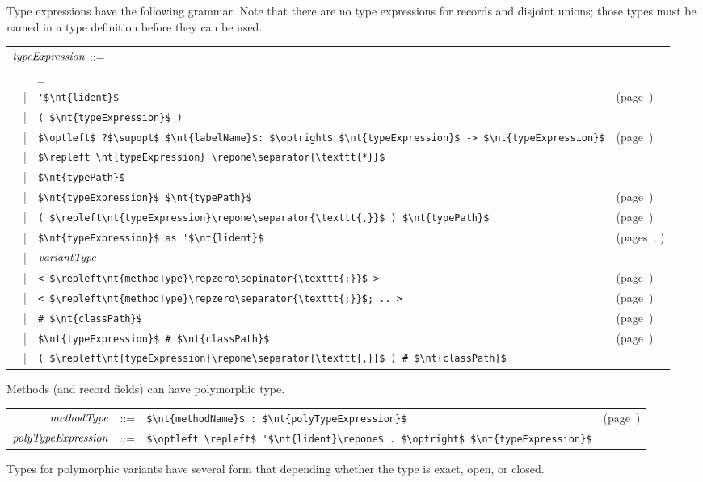 Type expressions have the following grammar.  Note that there are no type expressions for records
and disjoint unions; those types must be named in a type definition before they can be used.

\begin{center}
\begin{tabular}{rcll}
\multicolumn{3}{l}{$\textit{\rmfamily typeExpression}$ ::=}\\
&   & \hbox{\lstinline/_/}\\
& | & \hbox{\lstinline/'$\nt{lident}$/} & (page~\pageref{keyword:'})\\
& | & \hbox{\lstinline/( $\nt{typeExpression}$ )/}\\
& | & \hbox{\lstinline/$\optleft$ ?$\supopt$ $\nt{labelName}$: $\optright$ $\nt{typeExpression}$ -> $\nt{typeExpression}$/} & (page~\pageref{keyword:->})\\
& | & \hbox{\lstinline/$\repleft \nt{typeExpression} \repone\separator{\texttt{*}}$/}\\
& | & \hbox{\lstinline/$\nt{typePath}$/}\\
& | & \hbox{\lstinline/$\nt{typeExpression}$ $\nt{typePath}$/} & (page~\pageref{keyword:'})\\
& | & \hbox{\lstinline/( $\repleft\nt{typeExpression}\repone\separator{\texttt{,}}$ ) $\nt{typePath}$/} & (page~\pageref{keyword:'})\\
& | & \hbox{\lstinline/$\nt{typeExpression}$ as '$\nt{lident}$/} & (pages~\pageref{keyword:as(types)}, \pageref{keyword:as(object-types)})\\
& | & $\textit{\rmfamily variantType}$\\
& | & \hbox{\lstinline/< $\repleft\nt{methodType}\repzero\sepinator{\texttt{;}}$ >/} & (page~\pageref{object-types})\\
& | & \hbox{\lstinline/< $\repleft\nt{methodType}\repzero\separator{\texttt{;}}$; .. >/} & (page~\pageref{keyword:..})\\
& | & \hbox{\lstinline/# $\nt{classPath}$/} & (page~\pageref{keyword:hash-class})\\
& | & \hbox{\lstinline/$\nt{typeExpression}$ # $\nt{classPath}$/} & (page~\pageref{chapter:polyclasses})\\
& | & \hbox{\lstinline/( $\repleft\nt{typeExpression}\repone\separator{\texttt{,}}$ ) # $\nt{classPath}$/}
\end{tabular}
\end{center}
%
Methods (and record fields) can have polymorphic type.

\begin{center}
\begin{tabular}{rcll}
$\textit{\rmfamily methodType}$ & ::= & \hbox{\lstinline/$\nt{methodName}$ : $\nt{polyTypeExpression}$/} & (page~\pageref{types:polymorphic-methods})\\
$\textit{\rmfamily polyTypeExpression}$ & ::= & \hbox{\lstinline/$\optleft \repleft$ '$\nt{lident}\repone$ . $\optright$ $\nt{typeExpression}$/}
\end{tabular}
\end{center}
%
Types for polymorphic variants have several form that depending whether the type is exact, open, or closed.

